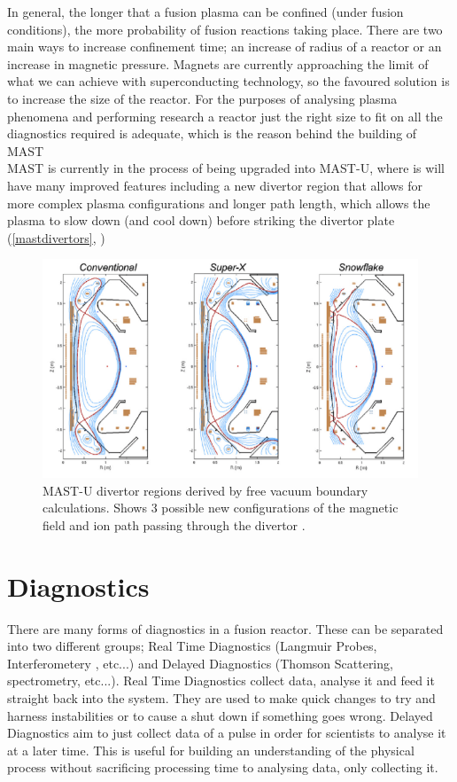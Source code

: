 \documentclass[12pt,a4paper,oneside]{report}
\begin{document}
In general, the longer that a fusion plasma can be confined (under fusion conditions), the more probability of fusion reactions taking place. There are two main ways to increase confinement time; an increase of radius of a reactor or an increase in magnetic pressure. Magnets are currently approaching the limit of what we can achieve with superconducting technology, so the favoured solution is to increase the size of the reactor. For the purposes of analysing plasma phenomena and performing research a reactor just the right size to fit on all the diagnostics required is adequate, which is the reason behind the building of MAST \cite{Chapman2015OverviewResults}\\

MAST is currently in the process of being upgraded into MAST-U, where is will have many improved features including a new divertor region that allows for more complex plasma configurations and longer path length, which allows the plasma to slow down (and cool down) before striking the divertor plate (\autoref{mastdivertors}, \cite{CulhamCenterforFusionEnergyResearch:Upgrade})

\begin{figure}[H]
\includegraphics[width=1\textwidth, center,angle=0]{Images/MASTUdivertors}
\caption{MAST-U divertor regions derived by free vacuum boundary calculations. Shows 3 possible new configurations of the magnetic field and ion path passing through the divertor \cite{CulhamCenterforFusionEnergyResearch:Upgrade}.}
\label{mastdivertors}
\end{figure}

	\section{Diagnostics}
There are many forms of diagnostics in a fusion reactor. These can be separated into two different groups; Real Time Diagnostics (Langmuir Probes, Interferometery \cite{Brunner2017}, etc...) and Delayed Diagnostics (Thomson Scattering\cite{Scannell2008DesignMAST}, spectrometry, etc...). Real Time Diagnostics collect data, analyse it and feed it straight back into the system. They are used to make quick changes to try and harness instabilities or to cause a shut down if something goes wrong. Delayed Diagnostics aim to just collect data of a pulse in order for scientists to analyse it at a later time. This is useful for building an understanding of the physical process without sacrificing processing time to analysing data, only collecting it. 
\medskip
\end{document}
